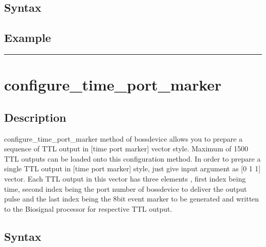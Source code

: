 \documentclass[letterpaper,10pt,english]{sphinxmanual}
\begin{document}
\subsection{Syntax}
\label{\detokenize{4_api_documentation:id5}}
\begin{sphinxVerbatim}[commandchars=\\\{\}]
\end{sphinxVerbatim}


\subsection{Example}
\label{\detokenize{4_api_documentation:id6}}
\begin{sphinxVerbatim}[commandchars=\\\{\}]
\end{sphinxVerbatim}


\bigskip\hrule\bigskip



\section{configure\_time\_port\_marker}
\label{\detokenize{4_api_documentation:configure-time-port-marker}}

\subsection{Description}
\label{\detokenize{4_api_documentation:id7}}
\sphinxAtStartPar
configure\_time\_port\_marker method of bossdevice allows you to prepare a sequence of TTL output in {[}time port marker{]} vector style. Maximum of 1500 TTL outputs can be loaded onto this configuration method. In order to prepare a single TTL output in {[}time port marker{]} style, just give input argument as {[}0 1 1{]} vector.
Each TTL output in this vector has three elements , first index being time, second index being the port number of bossdevice to deliver the output pulse and the last index being the 8\sphinxhyphen{}bit event marker to be generated and written to the Biosignal processor for respective TTL output.


\subsection{Syntax}
\label{\detokenize{4_api_documentation:id8}}
\begin{sphinxVerbatim}[commandchars=\\\{\}]
\PYG{p}{[}\PYG{p}{]}
\end{sphinxVerbatim}
\end{document}
